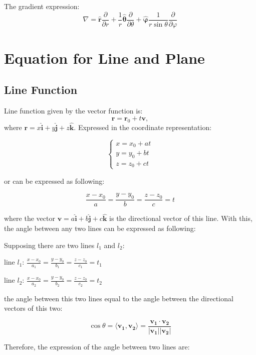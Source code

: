 \begin{itemize}
The gradient expression:
\begin{equation}
\boxed{\nabla = \hat{\bm{r}}\frac{\partial }{\partial r} 
+ \frac{1}{r}\hat{\bm{\theta}}\frac{\partial }{\partial \theta}
+ \hat{\bm{\varphi}}\frac{1}{r\sin \theta}\frac{\partial }{\partial \varphi}}
\end{equation}
\end{itemize}


\section{Equation for Line and Plane}
\subsection{Line Function}
Line function given by the vector function is:
\[\mathbf{r}=\mathbf{r}_0+t\mathbf{v},\]
where $\mathbf{r}=x\mathbf{\hat{i}}+y\mathbf{\hat{j}}+z\mathbf{\hat{k}}$.
Expressed in the coordinate representation:

\[\begin{cases}
x=x_0+at \\
y=y_0+bt \\
z=z_0+ct
\end{cases}\]

or can be expressed as following:

\[\frac{x-x_0}{a}=\frac{y-y_0}{b}=\frac{z-z_0}{c}=t\]

where the vector $\mathbf{v}=a\mathbf{\hat{i}}+b\mathbf{\hat{j}}+c\mathbf{\hat{k}}$ is the directional vector of this line. With this, the angle between any two lines can be expressed as following:

Supposing there are two lines $l_1$ and $l_2$:

\begin{center}
line $l_1$: $\frac{x-x_0}{a_1}=\frac{y-y_0}{b_1}=\frac{z-z_0}{c_1}=t_1$

line $l_2$: $\frac{x-x_0}{a_2}=\frac{y-y_0}{b_2}=\frac{z-z_0}{c_2}=t_2$
\end{center}

the angle between this two lines equal to the angle between the directional vectors of this two:

\[\cos \theta = \langle \mathbf{v_1},\mathbf{v_2} \rangle =\frac{\mathbf{v_1}\cdot \mathbf{v_2}}{|\mathbf{v_1}||\mathbf{v_2}|}\]

Therefore, the expression of the angle between two lines are:

